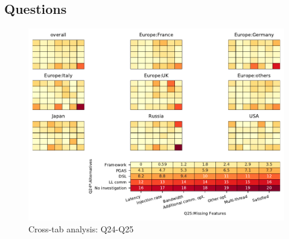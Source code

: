 
\subsection{Questions}


\begin{figure}
\begin{center}
\includegraphics[width=12cm]{../pdfs/Q24-Q25.pdf}
\caption{Cross-tab analysis: Q24-Q25}
\label{fig:Q24-Q25}
\end{center}
\end{figure}
